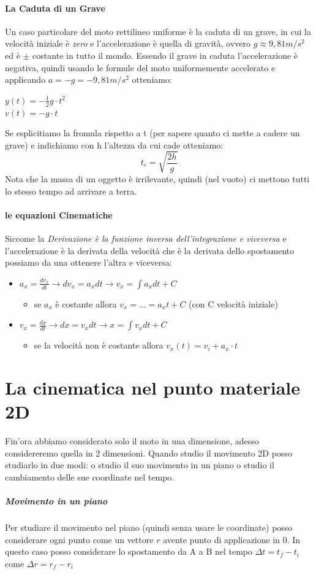 \documentclass[12pt, a4paper, openany]{book}
\begin{document}
\paragraph*{La Caduta di un Grave}
Un caso particolare del moto rettilineo uniforme è la caduta di un grave, in cui la velocità iniziale è \emph{zero} e
l'accelerazione è quella di gravità, ovvero $g\approx 9,81m/s^2$ ed è $\pm$ costante in tutto il mondo.
Essendo il grave in caduta l'accelerazione è negativa, quindi usando le formule del moto uniformemente accelerato e applicando $a=-g=-9,81m/s^2$ otteniamo:
\begin{center} %
    $y(t)=-\frac{1}{2} g\cdot t^2$\\$ v(t) = -g \cdot t$
\end{center}
Se esplicitiamo la fromula rispetto a t (per sapere quanto ci mette a cadere un grave) e indichiamo con h l'altezza da cui cade otteniamo:
$$t_c =\sqrt{\frac{2h}{g}}$$
Nota che la massa di un oggetto è irrilevante, quindi (nel vuoto) ci mettono tutti lo stesso tempo ad arrivare a terra.

\paragraph*{le equazioni Cinematiche}
Siccome la \emph{Derivazione è la funzione inversa dell'integrazione e viceversa} e l'accelerazione è la derivata della velocità che è la derivata dello spostamento
possiamo da una ottenere l'altra e viceversa:
\begin{itemize} %
    \item $a_x = \frac{dv_x}{dt} \to dv_x = a_xdt \to v_x = \int a_x dt + C$
          \begin{itemize}
              \item se $a_x$ è costante allora $v_x = ... = a_x t + C$ (con C velocità iniziale)
          \end{itemize}
    \item $v_x = \frac{dx}{dt} \to dx = v_xdt \to x = \int v_xdt + C$
          \begin{itemize}
              \item se la velocità non è costante allora $v_x(t) = v_i + a_x \cdot t$
          \end{itemize}
\end{itemize}
\section*{La cinematica nel punto materiale 2D}
Fin'ora abbiamo considerato solo il moto in una dimensione, adesso considereremo quella in 2 dimensioni.
Quando studio il movimento 2D posso studiarlo in due modi: o studio il suo movimento in un piano o studio il cambiamento delle sue coordinate nel tempo.
\subparagraph*{Movimento in un piano} Per studiare il movimento nel piano (quindi senza usare le coordinate) posso considerare ogni
punto come un vettore $r$ avente punto di applicazione in 0.
In questo caso posso considerare lo spostamento da A a B nel tempo $\Delta t = t_f-t_i$ come $\Delta r = r_f-r_i$
\end{document}

